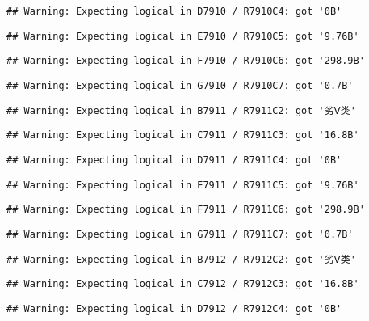 \documentclass[
]{article}
\begin{document}
\begin{verbatim}
## Warning: Expecting logical in D7910 / R7910C4: got '0B'
\end{verbatim}

\begin{verbatim}
## Warning: Expecting logical in E7910 / R7910C5: got '9.76B'
\end{verbatim}

\begin{verbatim}
## Warning: Expecting logical in F7910 / R7910C6: got '298.9B'
\end{verbatim}

\begin{verbatim}
## Warning: Expecting logical in G7910 / R7910C7: got '0.7B'
\end{verbatim}

\begin{verbatim}
## Warning: Expecting logical in B7911 / R7911C2: got '劣Ⅴ类'
\end{verbatim}

\begin{verbatim}
## Warning: Expecting logical in C7911 / R7911C3: got '16.8B'
\end{verbatim}

\begin{verbatim}
## Warning: Expecting logical in D7911 / R7911C4: got '0B'
\end{verbatim}

\begin{verbatim}
## Warning: Expecting logical in E7911 / R7911C5: got '9.76B'
\end{verbatim}

\begin{verbatim}
## Warning: Expecting logical in F7911 / R7911C6: got '298.9B'
\end{verbatim}

\begin{verbatim}
## Warning: Expecting logical in G7911 / R7911C7: got '0.7B'
\end{verbatim}

\begin{verbatim}
## Warning: Expecting logical in B7912 / R7912C2: got '劣Ⅴ类'
\end{verbatim}

\begin{verbatim}
## Warning: Expecting logical in C7912 / R7912C3: got '16.8B'
\end{verbatim}

\begin{verbatim}
## Warning: Expecting logical in D7912 / R7912C4: got '0B'
\end{verbatim}
\end{document}
